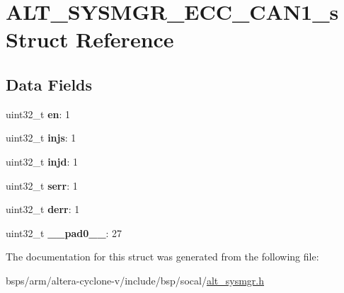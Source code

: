 \hypertarget{structALT__SYSMGR__ECC__CAN1__s}{}\section{A\+L\+T\+\_\+\+S\+Y\+S\+M\+G\+R\+\_\+\+E\+C\+C\+\_\+\+C\+A\+N1\+\_\+s Struct Reference}
\label{structALT__SYSMGR__ECC__CAN1__s}
\subsection*{Data Fields}
\begin{DoxyCompactItemize}
\item 
\mbox{\label{structALT__SYSMGR__ECC__CAN1__s_aef7fa24af9d2356eb3dfff8881c45a48}} 
uint32\+\_\+t {\bfseries en}\+: 1
\item 
\mbox{\label{structALT__SYSMGR__ECC__CAN1__s_a1ef6157eb4a28359fa5b5f3be422fa41}} 
uint32\+\_\+t {\bfseries injs}\+: 1
\item 
\mbox{\label{structALT__SYSMGR__ECC__CAN1__s_abafc2afdca9a0a31d49d7bf0decdd575}} 
uint32\+\_\+t {\bfseries injd}\+: 1
\item 
\mbox{\label{structALT__SYSMGR__ECC__CAN1__s_a167c0546e25419460104e342a3e75b19}} 
uint32\+\_\+t {\bfseries serr}\+: 1
\item 
\mbox{\label{structALT__SYSMGR__ECC__CAN1__s_ade2920e72d36b407543975fffa2f2324}} 
uint32\+\_\+t {\bfseries derr}\+: 1
\item 
\mbox{\label{structALT__SYSMGR__ECC__CAN1__s_a8275faed697c59fd3b8476ec4d661f6f}} 
uint32\+\_\+t {\bfseries \+\_\+\+\_\+pad0\+\_\+\+\_\+}\+: 27
\end{DoxyCompactItemize}


The documentation for this struct was generated from the following file\+:\begin{DoxyCompactItemize}
\item 
bsps/arm/altera-\/cyclone-\/v/include/bsp/socal/\mbox{\hyperlink{alt__sysmgr_8h}{alt\+\_\+sysmgr.\+h}}\end{DoxyCompactItemize}
